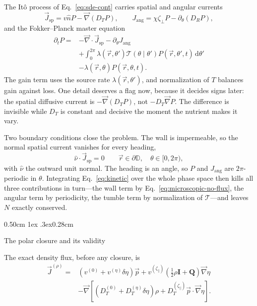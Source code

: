 \documentclass[
  reprint,
  superscriptaddress,
  amsmath,
  amssymb,
  aps,
  pre,
  nofootinbib,
  floatfix
]{revtex4-2}
\makeatletter
\newcommand{\rv}{\vec r}
\newcommand{\ev}{\hat{n}}
\newcommand{\pv}{\vec p}
\newcommand{\nv}{\hat\nu}
\newcommand{\Id}{\mathbf I}
\newcommand{\grad}{\vec{\nabla}}
\newcommand{\dd}{\mathrm d}
\newcommand{\Ud}{\mathbb D}
\newcommand{\zp}{\zeta_\parallel}
\def\section{\@startsection{section}{1}{\z@}%
  {0.50cm \@plus1ex \@minus.3ex}{0.28cm}%
  {\normalfont\small\bfseries\raggedright}}%
\makeatother
\begin{document}
The It\^o process of Eq.~\eqref{eq:sde-cont} carries spatial and angular
currents
\begin{equation}
  \vec J_{\mathrm{sp}}=v\ev P-\grad(D_TP),
  \qquad
  J_{\mathrm{ang}}=\chi\zeta_\perp P
  -\partial_\theta(D_RP),
  \label{eq:phase-currents}
\end{equation}
and the Fokker--Planck master equation
\begin{align}
  \partial_tP={}&-\grad\cdot\vec J_{\mathrm{sp}}
   -\partial_\theta J_{\mathrm{ang}}
  \nonumber\\
  &+\int_0^{2\pi}\lambda(\rv,\theta')\mathcal T(\theta\mid\theta')
  P(\rv,\theta',t)\,\dd\theta'
  \nonumber\\
  &-\lambda(\rv,\theta)P(\rv,\theta,t).
  \label{eq:kinetic}
\end{align}
The gain term uses the source rate $\lambda(\rv,\theta')$, and normalization
of $T$ balances gain against loss.  One detail deserves a flag now, because it
decides signs later: the spatial diffusive current is $-\grad(D_TP)$, not
$-D_T\grad P$.  The difference is invisible while $D_T$ is constant and
decisive the moment the nutrient makes it vary.

Two boundary conditions close the problem.  The wall is impermeable, so the
normal spatial current vanishes for every heading,
\begin{equation}
  \nv\cdot\vec J_{\mathrm{sp}}=0
  \qquad \rv\in\partial\Ud,\quad\theta\in[0,2\pi),
  \label{eq:microscopic-no-flux}
\end{equation}
with $\nv$ the outward unit normal.  The heading is an angle, so $P$ and
$J_{\mathrm{ang}}$ are $2\pi$-periodic in $\theta$.  Integrating
Eq.~\eqref{eq:kinetic} over the whole phase space then kills all three
contributions in turn---the wall term by Eq.~\eqref{eq:microscopic-no-flux},
the angular term by periodicity, the tumble term by normalization of
$\mathcal T$---and leaves $N$ exactly conserved.

\section{The polar closure and its validity}
\label{app:closure}

The exact density flux, before any closure, is
\begin{align}
 \vec J^{(\rho)} ={}& (v^{(0)}+v^{(\eta)}\delta\eta)\pv
 + v^{(\zp)}\left(\tfrac12\rho\Id + \mathbf Q\right)\grad\eta
 \nonumber\\
 & - \grad\left[(D_T^{(0)}+D_T^{(\eta)}\delta\eta)\rho
 + D_T^{(\zp)}\pv\cdot\grad\eta\right].
 \label{eq:exact-flux}
\end{align}
\end{document}
